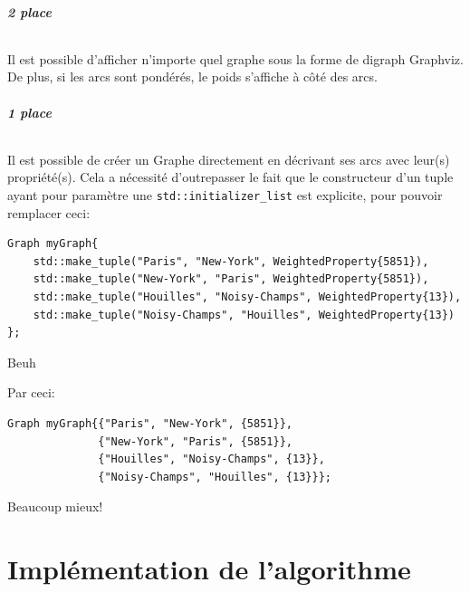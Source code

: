 \documentclass[french]{article}
\begin{document}
\subsubsection{2\ieme{} place}

\paragraph{} Il est possible d'afficher n'importe quel graphe sous la forme de
digraph Graphviz. De plus, si les arcs sont pondérés, le poids s'affiche à côté
des arcs.

\subsubsection{1\iere{} place}

\paragraph{} Il est possible de créer un Graphe directement en décrivant ses
arcs avec leur(s) propriété(s). Cela a nécessité d'outrepasser le fait que le
constructeur d'un tuple ayant pour paramètre une
\texttt{std::initializer_list} est explicite, pour pouvoir remplacer
ceci:

\begin{listing}[H]
\begin{verbatim}
Graph myGraph{
	std::make_tuple("Paris", "New-York", WeightedProperty{5851}),
	std::make_tuple("New-York", "Paris", WeightedProperty{5851}),
	std::make_tuple("Houilles", "Noisy-Champs", WeightedProperty{13}),
	std::make_tuple("Noisy-Champs", "Houilles", WeightedProperty{13})
};
\end{verbatim}
\caption{Beuh}
\label{tsp:beuh}
\end{listing}

Par ceci:

\begin{listing}[H]
\begin{verbatim}
Graph myGraph{{"Paris", "New-York", {5851}},
              {"New-York", "Paris", {5851}},
              {"Houilles", "Noisy-Champs", {13}},
              {"Noisy-Champs", "Houilles", {13}}};
\end{verbatim}
\caption{Beaucoup mieux!}
\label{tsp:better}
\end{listing}

\part{Implémentation de l'algorithme}
\end{document}
